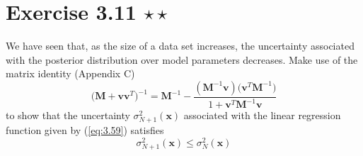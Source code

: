 \section*{Exercise 3.11 $\star \star$}
We have seen that, as the size of a data set increases, the uncertainty associated
with the posterior distribution over model parameters decreases. Make use of the
matrix identity (Appendix C)
\begin{equation}\label{eq:3.110}\tag{3.110}
    \big(\mathbf{M} + \mathbf{v}\mathbf{v}^T\big)^{-1}
    = \mathbf{M}^{-1} - \frac{(\mathbf{M}^{-1}\mathbf{v})\big(\mathbf{v}^T\mathbf{M}^{-1}\big)}
        {1 + \mathbf{v}^T\mathbf{M}^{-1}\mathbf{v}}
\end{equation}
to show that the uncertainty $\sigma^2_{N + 1}(\mathbf{x})$ associated with the
linear regression function given by (\ref{eq:3.59}) satisfies
\begin{equation}\label{eq:3.111}\tag{3.111}
    \sigma^2_{N + 1}(\mathbf{x}) \leq \sigma^2_N(\mathbf{x})
\end{equation}

\vspace{1em}

